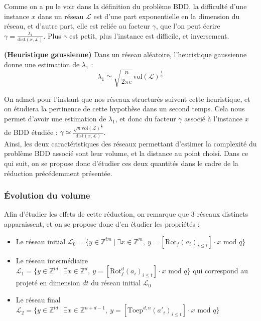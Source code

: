\documentclass[11pt,a4paper]{article}
\begin{document}
Comme on a pu le voir dans la définition du problème BDD, la difficulté d'une instance $x$ dans un réseau $\mathcal{L}$ est d'une part exponentielle en la dimension du réseau, et d'autre part, elle est reliée au facteur $\gamma$, que l'on peut écrire $\gamma = \frac{\lambda_1}{\text{dist}(x,\mathcal{L})}$. Plus $\gamma$ est petit, plus l'instance est difficile, et inversement. \\


\begin{rem}\textbf{(Heuristique gaussienne)}
Dans un réseau aléatoire, l'heuristique gaussienne donne une estimation de $\lambda_1$ :  \[\lambda_1 \simeq \sqrt{\frac{n}{2\pi e}}\text{vol}(\mathcal{L})^\frac{1}{n} \]
\end{rem}

On admet pour l'instant que nos réseaux structurés suivent cette heuristique, et on étudiera la pertinence de cette hypothèse dans un second temps. Cela nous permet d'avoir une estimation de $\lambda_1$, et donc du facteur $\gamma$ associé à l'instance $x$ de BDD étudiée : $\gamma \simeq \frac{\sqrt{n}\text{vol}(\mathcal{L})^\frac{1}{n}}{\text{dist}(x,\mathcal{L})}$. \\

Ainsi, les deux caractéristiques des réseaux permettant d'estimer la complexité du problème BDD associé sont leur volume, et la distance au point choisi.  Dans ce qui suit, on se propose donc d'étudier ces deux quantités dans le cadre de la réduction précédemment présentée.

\subsubsection{Évolution du volume }

Afin d'étudier les effets de cette réduction, on remarque que $3$ réseaux distincts apparaissent, et on se propose donc d'en étudier les propriétés : 
\begin{itemize}
\item Le réseau initial $\mathcal{L}_0 = \{ y \in \mathbb{Z}^{tm} \ | \ \exists x\in \mathbb{Z}^m,\ y=[\text{Rot}_f(a_i)_{i\leq t}]\cdot x \text{ mod }q \}$
\item Le réseau intermédiaire $\mathcal{L}_1 =\{ y \in \mathbb{Z}^{td} \ | \ \exists x\in \mathbb{Z}^d,\ y=[\text{Rot}_f^d(a_i)_{i\leq t}]\cdot x \text{ mod }q \}$  qui correspond au projeté en dimension $dt$ du réseau initial $\mathcal{L}_0$
\item Le réseau final $\mathcal{L}_2 = \{ y \in \mathbb{Z}^{td} \ | \ \exists x\in \mathbb{Z}^{n+d-1},\ y=[\text{Toep}^{d,n}(a'_i)_{i\leq t}]\cdot x \text{ mod }q\}$ \\
\end{itemize}
\end{document}
